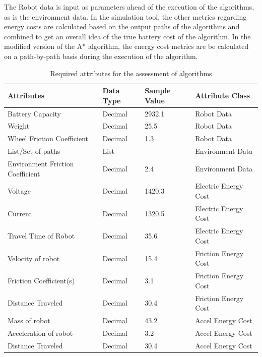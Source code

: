 \par
The Robot data is input as parameters ahead of the execution of the algorithms, as is the environment data. In the simulation tool, the other metrics regarding energy costs are calculated based on the output paths of the algorithms and combined to get an overall idea of the true battery cost of the algorithm. In the modified version of the A* algorithm, the energy cost metrics are  be calculated on a path-by-path basis during the execution of the algorithm.
\begin{table}[H]
\caption{Required attributes for the assessment of algorithms}\label{tab:inputs}
\centering
\footnotesize
\begin{tabular}{|l|l|l|l|}
\hline
\textbf{Attributes}          & \textbf{Data Type} & \textbf{Sample Value} & \textbf{Attribute Class}        \\ \hline
Battery Capacity                 & Decimal            & 2932.1                 & Robot Data               \\ \hline
Weight                           & Decimal            & 25.5                   & Robot Data               \\ \hline
Wheel Friction Coefficient       & Decimal            & 1.3                    & Robot Data               \\ \hline
List/Set of paths                & List               &                        & Environment Data         \\ \hline
Environment Friction Coefficient & Decimal            & 2.4                    & Environment Data         \\ \hline
Voltage                          & Decimal            & 1420.3                 & Electric Energy Cost   \\ \hline
Current                          & Decimal            & 1320.5                 & Electric Energy Cost   \\ \hline
Travel Time of Robot             & Decimal            & 35.6                   & Electric Energy Cost   \\ \hline
Velocity of robot                & Decimal            & 15.4                   & Friction Energy Cost   \\ \hline
Friction Coefficient(s)          & Decimal            & 3.1                    & Friction Energy Cost   \\ \hline
Distance Traveled                & Decimal            & 30.4                   & Friction Energy Cost   \\ \hline
Mass of robot                    & Decimal            & 43.2                   & Accel Energy Cost \\ \hline
Acceleration of robot            & Decimal            & 3.2                    & Accel Energy Cost \\ \hline
Distance Traveled                & Decimal            & 30.4                   & Accel Energy Cost \\ \hline
\end{tabular}
\end{table}

